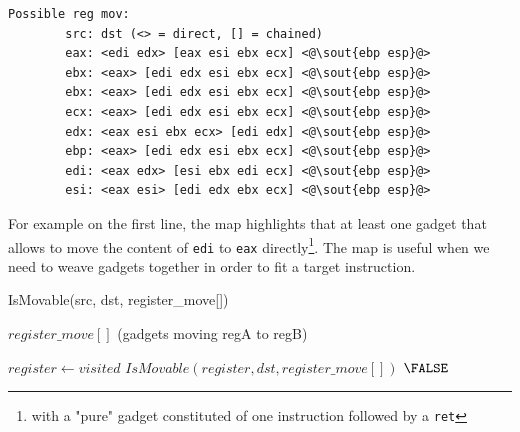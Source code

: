 \documentclass[10pt,twocolumn]{article}
\begin{document}
\begin{lstlisting}[float=h,aboveskip=\medskipamount,belowskip=0pt,caption=Map
of movement between registers,label=lst:map]
Possible reg mov:
        src: dst (<> = direct, [] = chained)
        eax: <edi edx> [eax esi ebx ecx] <@\sout{ebp esp}@>
        ebx: <eax> [edi edx esi ebx ecx] <@\sout{ebp esp}@>
        ebx: <eax> [edi edx esi ebx ecx] <@\sout{ebp esp}@>
        ecx: <eax> [edi edx esi ebx ecx] <@\sout{ebp esp}@>
        edx: <eax esi ebx ecx> [edi edx] <@\sout{ebp esp}@>
        ebp: <eax> [edi edx esi ebx ecx] <@\sout{ebp esp}@>
        edi: <eax edx> [esi ebx edi ecx] <@\sout{ebp esp}@>
        esi: <eax esi> [edi edx ebx ecx] <@\sout{ebp esp}@>
\end{lstlisting}

For example on the first line, the map highlights that at least one gadget that
allows to move the content of \texttt{edi} to \texttt{eax}
directly\footnote{with a "pure" gadget constituted of one instruction followed
by a \texttt{ret}}. The map is useful when we need to weave gadgets together
in order to fit a target instruction.

\begin{algorithm}
    \caption{IsMovable(src, dst, register\_move[])}
    \label{alg:is_movable}
    \begin{algorithmic}[1] 
        \REQUIRE $register\_move[]$ (gadgets moving regA to regB)
        
                        \RETURN \TRUE
                        \ENDIF
                    \ENDIF
                \ENDFOR
            \ENDIF
        \ENDFOR

                \STATE $register \leftarrow visited$
                        \RETURN $IsMovable(register, dst, register\_move[])$
                        \ENDIF
                    \ENDIF
                \ENDFOR
            \ENDIF
        \ENDFOR
        \RETURN $\FALSE$

    \end{algorithmic}
\end{algorithm}
\end{document}
